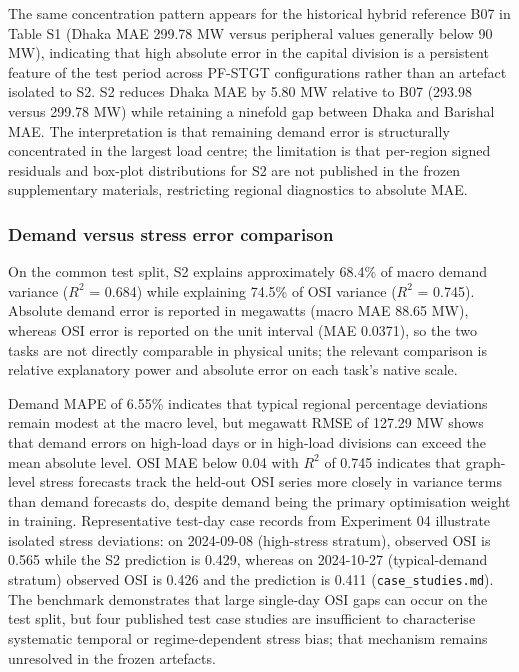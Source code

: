 The same concentration pattern appears for the historical hybrid reference B07 in Table S1 (Dhaka MAE 299.78 MW versus peripheral values generally below 90 MW), indicating that high absolute error in the capital division is a persistent feature of the test period across PF-STGT configurations rather than an artefact isolated to S2. S2 reduces Dhaka MAE by 5.80 MW relative to B07 (293.98 versus 299.78 MW) while retaining a ninefold gap between Dhaka and Barishal MAE. The interpretation is that remaining demand error is structurally concentrated in the largest load centre; the limitation is that per-region signed residuals and box-plot distributions for S2 are not published in the frozen supplementary materials, restricting regional diagnostics to absolute MAE.

\subsubsection{Demand versus stress error comparison}\label{subsubsection:demand_versus_stress_error_comparison}

On the common test split, S2 explains approximately 68.4\% of macro demand variance ($R^2$ = 0.684) while explaining 74.5\% of OSI variance ($R^2$ = 0.745). Absolute demand error is reported in megawatts (macro MAE 88.65 MW), whereas OSI error is reported on the unit interval (MAE 0.0371), so the two tasks are not directly comparable in physical units; the relevant comparison is relative explanatory power and absolute error on each task’s native scale.

Demand MAPE of 6.55\% indicates that typical regional percentage deviations remain modest at the macro level, but megawatt RMSE of 127.29 MW shows that demand errors on high-load days or in high-load divisions can exceed the mean absolute level. OSI MAE below 0.04 with $R^2$ of 0.745 indicates that graph-level stress forecasts track the held-out OSI series more closely in variance terms than demand forecasts do, despite demand being the primary optimisation weight in training. Representative test-day case records from Experiment 04 illustrate isolated stress deviations: on 2024-09-08 (high-stress stratum), observed OSI is 0.565 while the S2 prediction is 0.429, whereas on 2024-10-27 (typical-demand stratum) observed OSI is 0.426 and the prediction is 0.411 (\texttt{case\_studies.md}). The benchmark demonstrates that large single-day OSI gaps can occur on the test split, but four published test case studies are insufficient to characterise systematic temporal or regime-dependent stress bias; that mechanism remains unresolved in the frozen artefacts.

